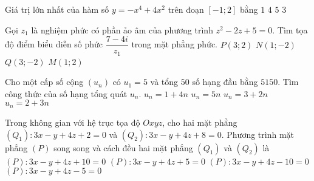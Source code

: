 \begin{ex}%
Giá trị lớn nhất của hàm số $y=-x^4+4x^2$ trên đoạn $[-1;2]$ bằng
\choice
{$1$}
{\True $4$}
{$5$}
{$3$}
\end{ex}

\begin{ex}%
Gọi $z_1$ là nghiệm phức có phần ảo âm của phương trình $z^2-2z+5=0$. Tìm tọa độ điểm biểu diễn số phức $\dfrac{7-4i}{z_1}$ trong mặt phẳng phức.
\choice
{\True $P(3;2)$}
{$N(1;-2)$}
{$Q(3;-2)$}
{$M(1;2)$}
\end{ex}

\begin{ex}%
Cho một cấp số cộng $(u_n)$ có $u_1=5$ và tổng $50$ số hạng đầu bằng $5150$. Tìm công thức của số hạng tổng quát $u_n$.
\choice
{\True $u_n=1+4n$}
{$u_n=5n$}
{$u_n=3+2n$}
{$u_n=2+3n$}
\end{ex}

\begin{ex}%
Trong không gian với hệ trục tọa độ $Oxyz$, cho hai mặt phẳng $(Q_1)\colon 3x-y+4z+2=0$ và $(Q_2)\colon 3x-y+4z+8=0$. Phương trình mặt phẳng $(P)$ song song và cách đều hai mặt phẳng $(Q_1)$ và $(Q_2)$ là
\choice
{$(P)\colon 3x-y+4z+10=0$}
{\True $(P)\colon 3x-y+4z+5=0$}
{$(P)\colon 3x-y+4z-10=0$}
{$(P)\colon 3x-y+4z-5=0$}
\end{ex}

